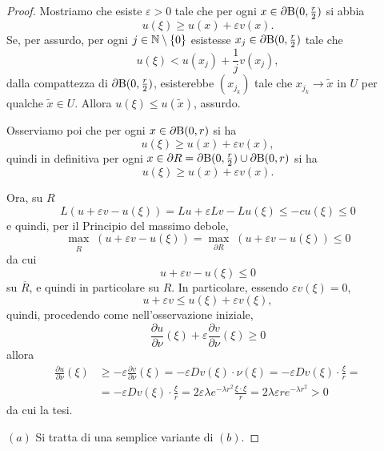\begin{proof}
	Mostriamo che esiste $\varepsilon > 0 $ tale che per ogni $x \in \partial \textup{B}(0,\frac{r}{2})$ si abbia
	\[ u(\xi) \ge u(x) +\varepsilon v(x). \]
	Se, per assurdo, per ogni $j \in \mathbb{N}\setminus \left\lbrace 0\right\rbrace $ esistesse $x_j \in \partial \textup{B}(0,\frac{r}{2})$ tale che
	\[ u(\xi) < u(x_j) + \frac{1}{j}v(x_j), \]
	dalla compattezza di $\partial \textup{B}(0,\frac{r}{2})$, esisterebbe $(x_{j_k})$ tale che $x_{j_k} \to \tilde{x}$ in $U$ per qualche $\tilde{x} \in U$. Allora $u(\xi) \le u(\tilde{x})$, assurdo.
	
	Osserviamo poi che per ogni $x \in \partial \textup{B}(0,r)$ si ha
	\[ u(\xi) \ge u(x) +\varepsilon v(x), \]
	quindi in definitiva per ogni $x \in \partial R = \partial \textup{B}(0,\frac{r}{2}) \cup \partial \textup{B}(0,r)$ si ha
	\[  u(\xi) \ge u(x) +\varepsilon v(x). \]
	
	Ora, su $R$
	\[ L\left(  u + \varepsilon v -u(\xi)\right)  = Lu +\varepsilon Lv - Lu(\xi) \le -cu(\xi) \le 0 \]
	e quindi, per il Principio del massimo debole,
	\[ \underset{\overline{R}}{\max} \; \left(  u + \varepsilon v -u(\xi)\right) = \underset{\partial R}{\max} \; \left(  u + \varepsilon v -u(\xi)\right) \le 0 \]
	da cui 
	\[   u + \varepsilon v -u(\xi) \le 0\]
	su $\overline{R}$, e quindi in particolare su $R$. In particolare, essendo $\varepsilon v(\xi) = 0$, 
	\[  u + \varepsilon v  \le u(\xi) + \varepsilon v(\xi), \]
	quindi, procedendo come nell'osservazione iniziale,
	\[ \frac{\partial u}{\partial \nu}(\xi) + \varepsilon \frac{\partial v}{\partial \nu}(\xi) \ge 0 \]
	allora
	\begin{align*}
		\frac{\partial u}{\partial \nu}(\xi) &\ge - \varepsilon \frac{\partial v}{\partial \nu}(\xi) = -\varepsilon Dv(\xi) \cdot \nu(\xi) =-\varepsilon Dv(\xi) \cdot \frac{\xi}{r} = \\
		&= -\varepsilon Dv(\xi) \cdot \frac{\xi}{r} = 2\varepsilon \lambda e^{-\lambda r^2}\frac{\xi \cdot \xi}{r} = 2\lambda \varepsilon re^{-\lambda r^2} > 0 
	\end{align*}
	da cui la tesi.
	\par\noindent
	$(a)$ Si tratta di una semplice variante di $(b)$.
\end{proof}


